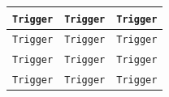     \begin{center}
    \begin{tabular}{ | m{1.5cm} | m{1.5cm}| m{1.5cm} | }
      \hline
      \texttt{Trigger} & \texttt{Trigger} & \texttt{Trigger} \\
      \hline
      \texttt{Trigger} & \texttt{Trigger} & \texttt{Trigger} \\
      \hline
      \texttt{Trigger} & \texttt{Trigger} & \texttt{Trigger} \\
      \hline
      \texttt{Trigger} & \texttt{Trigger} & \texttt{Trigger} \\
      \hline
    \end{tabular}
    \end{center}

